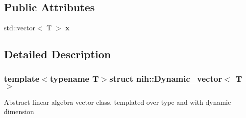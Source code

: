 \subsection*{\-Public \-Attributes}
\begin{DoxyCompactItemize}
\item 
\hypertarget{structnih_1_1_dynamic__vector_a1b8e9f0996bc064c0a3d753e014964db}{
std\-::vector$<$ \-T $>$ {\bfseries x}}
\label{structnih_1_1_dynamic__vector_a1b8e9f0996bc064c0a3d753e014964db}

\end{DoxyCompactItemize}


\subsection{\-Detailed \-Description}
\subsubsection*{template$<$typename \-T$>$struct nih\-::\-Dynamic\-\_\-vector$<$ T $>$}

\-Abstract linear algebra vector class, templated over type and with dynamic dimension 

